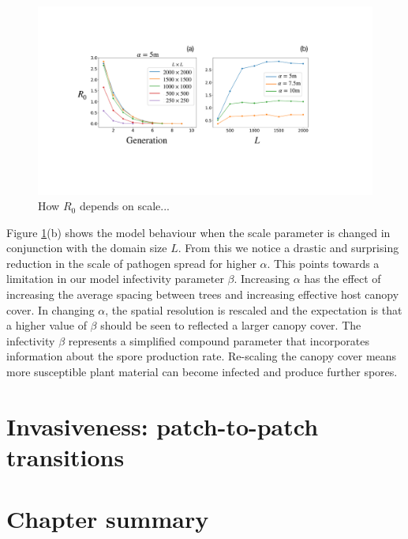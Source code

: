 \begin{figure}
    \centering
    \includegraphics[scale=0.3]{chapter5/figures/fig2.pdf}
    \caption{How $R_0$ depends on scale...}
    \label{fig:R0-spatial-scale}
\end{figure}

Figure \ref{fig:R0-spatial-scale}(b) shows the model behaviour when the scale parameter is %
changed in conjunction with the domain size $L$. From this we notice a drastic and surprising %
reduction in the scale of pathogen spread for higher $\alpha$. %
This points towards a limitation in our model infectivity parameter $\beta$. %
Increasing $\alpha$ has the effect of increasing the average spacing between trees and %
increasing effective host canopy cover. %
In changing $\alpha$, the spatial resolution is rescaled and the expectation is that a higher value of $\beta$ should be seen to reflected a larger canopy cover. %
The infectivity $\beta$ represents a simplified compound parameter that incorporates information about the spore production rate. %
Re-scaling the canopy cover means more susceptible plant material can become infected and produce further spores. 

\section{Invasiveness: patch-to-patch transitions}

\textcolor{red}{\blindtext}
\newpage


\section{Chapter summary}

\textcolor{red}{\blindtext}
\newpage
